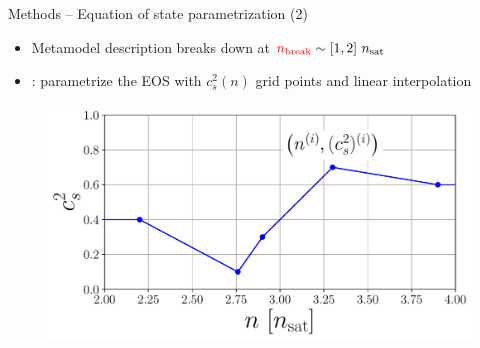 \documentclass[usenames,dvipsnames,t]{beamer}
\begin{document}
\begin{frame}{Methods -- Equation of state parametrization (2)}

  \def\x{3mm}
  \def\y{1mm}
    
  \begin{itemize}
    \item Metamodel description breaks down at $\red{n_{\rm{break}}} \sim [1, 2] \ n_{\rm{sat}}$

    \vspace{\x}
    
    \item {}: parametrize the EOS with $c_s^2(n)$ grid points and linear interpolation~\cite{Somasundaram:2021clp}
    
  \end{itemize}
  
  \vspace{\y}

  \begin{figure}
    \centering
    \includegraphics[width=0.65\linewidth]{Figures/cs2_sketch.pdf}
  \end{figure}
\end{frame}






    
\end{document}
